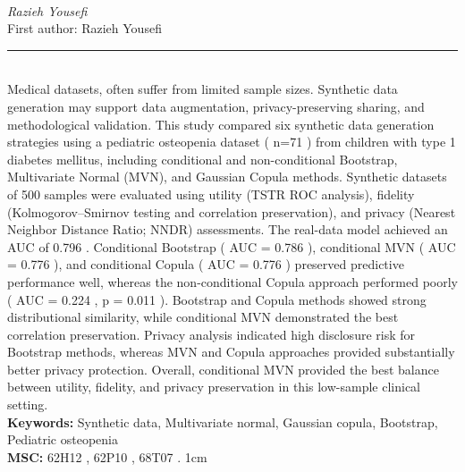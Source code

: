 \documentclass[10pt,twoside]{article}
\begin{document}
\noindent\begin{minipage}[t][\textheight]{\textwidth}
\\[0.35em]
{\itshape Razieh Yousefi}\\[0.2em]
{\footnotesize First author: Razieh Yousefi}\\[0.45em]
\noindent\rule{\textwidth}{0.3pt}\\[0.4em]
{\footnotesize  Medical datasets, often suffer from limited sample sizes. Synthetic data generation may support data augmentation, privacy-preserving sharing, and methodological validation. This study compared six synthetic data generation strategies using a pediatric osteopenia dataset ( n=71 ) from children with type 1 diabetes mellitus, including conditional and non-conditional Bootstrap, Multivariate Normal (MVN), and Gaussian Copula methods. Synthetic datasets of 500 samples were evaluated using utility (TSTR ROC analysis), fidelity (Kolmogorov--Smirnov testing and correlation preservation), and privacy (Nearest Neighbor Distance Ratio; NNDR) assessments. The real-data model achieved an AUC of 0.796 . Conditional Bootstrap ( AUC = 0.786 ), conditional MVN ( AUC = 0.776 ), and conditional Copula ( AUC = 0.776 ) preserved predictive performance well, whereas the non-conditional Copula approach performed poorly ( AUC = 0.224 , p = 0.011 ). Bootstrap and Copula methods showed strong distributional similarity, while conditional MVN demonstrated the best correlation preservation. Privacy analysis indicated high disclosure risk for Bootstrap methods, whereas MVN and Copula approaches provided substantially better privacy protection. Overall, conditional MVN provided the best balance between utility, fidelity, and privacy preservation in this low-sample clinical setting.}\\[0.4em]
{\footnotesize\bfseries Keywords:} {\footnotesize Synthetic data, Multivariate normal, Gaussian copula, Bootstrap, Pediatric osteopenia}\\[0.15em]
{\footnotesize\bfseries MSC:} {\footnotesize 62H12 , 62P10 , 68T07 . 1cm}\\
\vfill
\end{minipage}
\newpage
\end{document}
